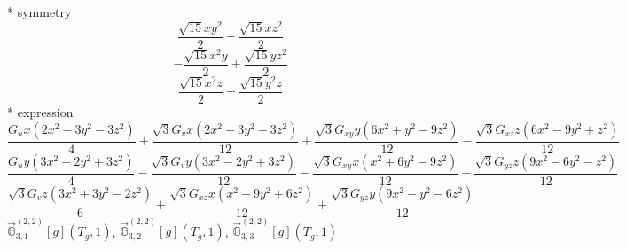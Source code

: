 \documentclass[fleqn,8pt]{jsarticle}
\begin{document}
\noindent\quad ** symmetry
\begin{dmath*}
\frac{\sqrt{15} x y^{2}}{2} - \frac{\sqrt{15} x z^{2}}{2}
\end{dmath*}
\begin{dmath*}
- \frac{\sqrt{15} x^{2} y}{2} + \frac{\sqrt{15} y z^{2}}{2}
\end{dmath*}
\begin{dmath*}
\frac{\sqrt{15} x^{2} z}{2} - \frac{\sqrt{15} y^{2} z}{2}
\end{dmath*}
\noindent\quad ** expression
\begin{dmath*}
\frac{G_{u} x \left(2 x^{2} - 3 y^{2} - 3 z^{2}\right)}{4} + \frac{\sqrt{3} G_{v} x \left(2 x^{2} - 3 y^{2} - 3 z^{2}\right)}{12} + \frac{\sqrt{3} G_{xy} y \left(6 x^{2} + y^{2} - 9 z^{2}\right)}{12} - \frac{\sqrt{3} G_{xz} z \left(6 x^{2} - 9 y^{2} + z^{2}\right)}{12}
\end{dmath*}
\begin{dmath*}
\frac{G_{u} y \left(3 x^{2} - 2 y^{2} + 3 z^{2}\right)}{4} - \frac{\sqrt{3} G_{v} y \left(3 x^{2} - 2 y^{2} + 3 z^{2}\right)}{12} - \frac{\sqrt{3} G_{xy} x \left(x^{2} + 6 y^{2} - 9 z^{2}\right)}{12} - \frac{\sqrt{3} G_{yz} z \left(9 x^{2} - 6 y^{2} - z^{2}\right)}{12}
\end{dmath*}
\begin{dmath*}
\frac{\sqrt{3} G_{v} z \left(3 x^{2} + 3 y^{2} - 2 z^{2}\right)}{6} + \frac{\sqrt{3} G_{xz} x \left(x^{2} - 9 y^{2} + 6 z^{2}\right)}{12} + \frac{\sqrt{3} G_{yz} y \left(9 x^{2} - y^{2} - 6 z^{2}\right)}{12}
\end{dmath*}
\noindent\quad $\vec{\mathbb{G}}_{3,1}^{(2,2)}[g](T_{g},1)$, $\vec{\mathbb{G}}_{3,2}^{(2,2)}[g](T_{g},1)$, $\vec{\mathbb{G}}_{3,3}^{(2,2)}[g](T_{g},1)$
\end{document}
